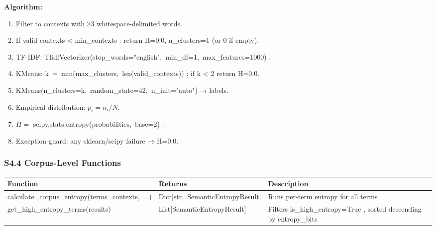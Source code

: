 \documentclass[
]{article}
\newcounter{none} %
\providecommand{\tightlist}{%
  \setlength{\itemsep}{0pt}\setlength{\parskip}{0pt}}
\numberwithin{equation}{section}
\renewcommand{\texttt}[1]{%
    \colorbox{codebg}{\color{codefg}\ttfamily #1}%
}
\begin{document}
\textbf{Algorithm:}

\begin{enumerate}
\def\labelenumi{\arabic{enumi}.}
\tightlist
\item
  Filter to contexts with ≥3 whitespace-delimited words.
\item
  If valid contexts \textless{} \texttt{min\_contexts}: return H=0.0,
  n\_clusters=1 (or 0 if empty).
\item
  TF-IDF:
  \texttt{TfidfVectorizer(stop\_words="english",\ min\_df=1,\ max\_features=1000)}.
\item
  KMeans: \texttt{k\ =\ min(max\_clusters,\ len(valid\_contexts))}; if k
  \textless{} 2 return H=0.0.
\item
  \texttt{KMeans(n\_clusters=k,\ random\_state=42,\ n\_init="auto")} →
  labels.
\item
  Empirical distribution: \(p_i = n_i / N\).
\item
  \(H =\) \texttt{scipy.stats.entropy(probabilities,\ base=2)}.
\item
  Exception guard: any sklearn/scipy failure → H=0.0.
\end{enumerate}

\subsubsection{S4.4 Corpus-Level
Functions}\label{s4.4-corpus-level-functions}

{\def\LTcaptype{none} %
\begin{longtable}[]{@{}
  >{\raggedright\arraybackslash}p{}
  >{\raggedright\arraybackslash}p{}
  >{\raggedright\arraybackslash}p{}@{}}
\toprule\noalign{}
\begin{minipage}[b]{\linewidth}\raggedright
Function
\end{minipage} & \begin{minipage}[b]{\linewidth}\raggedright
Returns
\end{minipage} & \begin{minipage}[b]{\linewidth}\raggedright
Description
\end{minipage} \\
\midrule\noalign{}
\endhead
\bottomrule\noalign{}
\endlastfoot
\texttt{calculate\_corpus\_entropy(terms\_contexts,\ ...)} &
\texttt{Dict{[}str,\ SemanticEntropyResult{]}} & Runs per-term entropy
for all terms \\
\texttt{get\_high\_entropy\_terms(results)} &
\texttt{List{[}SemanticEntropyResult{]}} & Filters
\texttt{is\_high\_entropy=True}, sorted descending by
\texttt{entropy\_bits} \\
\end{longtable}
}
\end{document}
